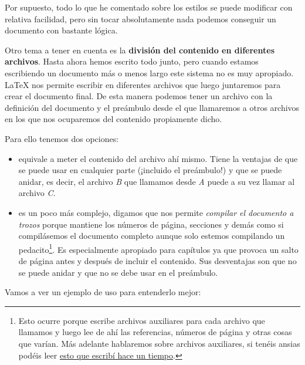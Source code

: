 Por supuesto, todo lo que he comentado sobre los estilos se puede
modificar con relativa facilidad, pero sin tocar absolutamente nada
podemos conseguir un documento con bastante lógica.

Otro tema a tener en cuenta es la \textbf{división del contenido en
diferentes archivos}. Hasta ahora hemos escrito todo junto, pero cuando
estamos escribiendo un documento más o menos largo este sistema no es
muy apropiado. LaTeX nos permite escribir en diferentes archivos que
luego juntaremos para crear el documento final. De esta manera podemos
tener un archivo con la definición del documento y el preámbulo desde el
que llamaremos a otros archivos en los que nos ocuparemos del contenido
propiamente dicho.

Para ello tenemos dos opciones:

\begin{itemize}
\item
  \lstinline!! equivale a meter el contenido del archivo ahí
  mismo. Tiene la ventajas de que se puede usar en cualquier parte
  (¡incluido el preámbulo!) y que se puede anidar, es decir, el archivo
  \emph{B} que llamamos desde \emph{A} puede a su vez llamar al archivo
  \emph{C}.
\item
  \lstinline!! es un poco más complejo, digamos que nos
  permite \emph{compilar el documento a trozos} porque mantiene los
  números de página, secciones y demás como si compilásemos el documento
  completo aunque solo estemos compilando un pedacito\footnote{Esto
    ocurre porque escribe archivos auxiliares para cada archivo que
    llamamos y luego lee de ahí las referencias, números de página y
    otras cosas que varían. Más adelante hablaremos sobre archivos
    auxiliares, si tenéis ansias podéis leer
    \href{https://ondahostil.wordpress.com/2016/11/17/lo-que-he-aprendido-archivos-auxiliares-de-latex/}{esto
    que escribí hace un tiempo}.}. Es especialmente apropiado para
  capítulos ya que provoca un salto de página antes y después de incluir
  el contenido. Sus desventajas son que no se puede anidar y que no se
  debe usar en el preámbulo.
\end{itemize}

Vamos a ver un ejemplo de uso para entenderlo mejor:

